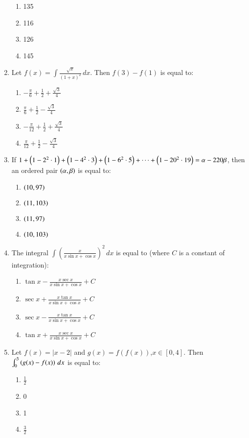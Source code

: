 \documentclass[journal,12pt,twocolumn]{IEEEtran}
\theoremstyle{remark}
\begin{document}
\begin{enumerate}
\begin{enumerate}
    \item 135
    \item 116
    \item 126
    \item 145
\end{enumerate}
\item Let $f(x)=\int\frac{\sqrt{x}}{(1+x)^2}\,dx$. Then $f(3)-f(1)$ is equal to:
\begin{enumerate}
    \item $-\frac{\pi}{6}+\frac{1}{2}+\frac{\sqrt{3}}{4}$
    \item $\frac{\pi}{6}+\frac{1}{2}-\frac{\sqrt{3}}{4}$
    \item $-\frac{\pi}{12}+\frac{1}{2}+\frac{\sqrt{3}}{4}$
    \item $\frac{\pi}{12}+\frac{1}{2}-\frac{\sqrt{3}}{4}$
\end{enumerate}
\item If $1+\left(1-2^2\cdot1\right)+\left(1-4^2\cdot3\right)+\left(1-6^2\cdot5\right)+\cdots+\left(1-20^2\cdot19\right)=\alpha-220\beta$, then an ordered pair $\left(\alpha,\beta\right)$ is equal to:
\begin{enumerate}
    \item $\left(10, 97\right)$
    \item $\left(11, 103\right)$
    \item $\left(11, 97\right)$
    \item $\left(10,103\right)$
\end{enumerate}
\item The integral $\int\left(\frac{x}{x\sin x+\cos x}\right)^2\,dx$ is equal to (where $C$ is a constant of integration):
\begin{enumerate}
    \item $\tan x-\frac{x\sec x}{x\sin x+\cos x}+C$
    \item $\sec x+\frac{x\tan x}{x\sin x+\cos x}+C$
    \item $\sec x-\frac{x\tan x}{x\sin x+\cos x}+C$
    \item $\tan x+\frac{x\sec x}{x \sin x + \cos x}+C$
\end{enumerate}
\item Let $f(x)=|x-2|$ and $g(x)=f(f(x))$,$x\in [0, 4]$. Then $\int_0^3 \left(g(x)-f(x)\right)\, dx$ is equal to:
\begin{enumerate}
    \item $\frac{1}{2}$
    \item 0
    \item 1
    \item $\frac{3}{2}$

\end{enumerate}
\end{enumerate}
\end{document}
